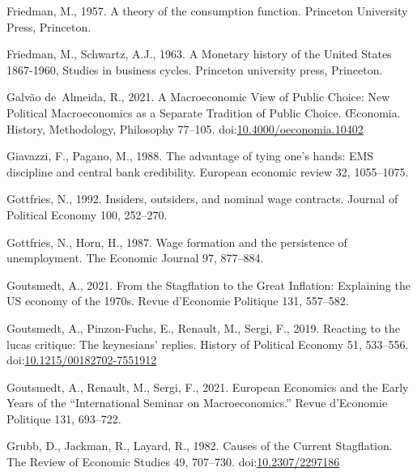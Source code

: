 \documentclass[
  12pt,
  onecolumn]{article}
\newlength{\cslhangindent}
\newlength{\cslentryspacingunit} %
\newenvironment{CSLReferences}[2] %
 {%
  \setlength{\parindent}{0pt}
  \ifodd #1
  \let\oldpar\par
  \def\par{\hangindent=\cslhangindent\oldpar}
  \fi
  \setlength{\parskip}{#2\cslentryspacingunit}
 }%
 {}
\begin{document}
\begin{CSLReferences}{1}{0}
\leavevmode{}%
Friedman, M., 1957. A theory of the consumption function. Princeton
University Press, Princeton.

\leavevmode{}%
Friedman, M., Schwartz, A.J., 1963. A {Monetary} history of the {United}
{States} 1867-1960, Studies in business cycles. Princeton university
press, Princeton.

\leavevmode{}%
Galvão de~Almeida, R., 2021. A {Macroeconomic View} of {Public Choice}:
{New Political Macroeconomics} as a {Separate Tradition} of {Public
Choice}. Œconomia. History, Methodology, Philosophy 77--105.
doi:\href{https://doi.org/10.4000/oeconomia.10402}{10.4000/oeconomia.10402}

\leavevmode{}%
Giavazzi, F., Pagano, M., 1988. The advantage of tying one's hands:
{EMS} discipline and central bank credibility. European economic review
32, 1055--1075.

\leavevmode{}%
Gottfries, N., 1992. Insiders, outsiders, and nominal wage contracts.
Journal of Political Economy 100, 252--270.

\leavevmode{}%
Gottfries, N., Horn, H., 1987. Wage formation and the persistence of
unemployment. The Economic Journal 97, 877--884.

\leavevmode{}%
Goutsmedt, A., 2021. From the {Stagflation} to the {Great Inflation}:
{Explaining} the {US} economy of the 1970s. Revue d'Economie Politique
131, 557--582.

\leavevmode{}%
Goutsmedt, A., Pinzon-Fuchs, E., Renault, M., Sergi, F., 2019. Reacting
to the lucas critique: {The} keynesians' replies. History of Political
Economy 51, 533--556.
doi:\href{https://doi.org/10.1215/00182702-7551912}{10.1215/00182702-7551912}

\leavevmode{}%
Goutsmedt, A., Renault, M., Sergi, F., 2021. European {Economics} and
the {Early Years} of the {``{International Seminar} on
{Macroeconomics}.''} Revue d'Economie Politique 131, 693--722.

\leavevmode{}%
Grubb, D., Jackman, R., Layard, R., 1982. Causes of the {Current
Stagflation}. The Review of Economic Studies 49, 707--730.
doi:\href{https://doi.org/10.2307/2297186}{10.2307/2297186}


\end{CSLReferences}
\end{document}
